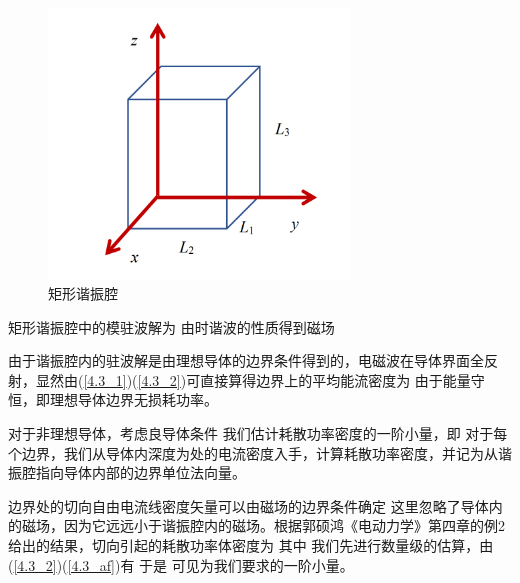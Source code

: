 
    \begin{figure}[htbp]
        \centering
        \includegraphics[width=8cm]{img/4.3/1.png}
        \caption{矩形谐振腔}
        \label{4.3_fig:矩形谐振腔}
    \end{figure}
    
    矩形谐振腔中的模驻波解为
    由时谐波的性质得到磁场
    
    由于谐振腔内的驻波解是由理想导体的边界条件得到的，电磁波在导体界面全反射，显然由(\ref{4.3_1})(\ref{4.3_2})可直接算得边界上的平均能流密度为
    由于能量守恒，即理想导体边界无损耗功率。
    
    对于非理想导体，考虑良导体条件
    我们估计耗散功率密度的一阶小量，即
    对于每个边界，我们从导体内深度为\nota{\xi}处的电流密度入手，计算耗散功率密度，并记为从谐振腔指向导体内部的边界单位法向量。
    
    边界处的切向自由电流线密度矢量\nota{\af}可以由磁场的边界条件确定
    这里忽略了导体内的磁场，因为它远远小于谐振腔内的磁场\nota{\h}。根据郭硕鸿《电动力学》第四章的例2给出的结果，切向\nota{\af}引起的耗散功率体密度为
    其中
    我们先进行数量级的估算，由(\ref{4.3_2})(\ref{4.3_af})有
    于是
    可见为我们要求的一阶小量。
    
